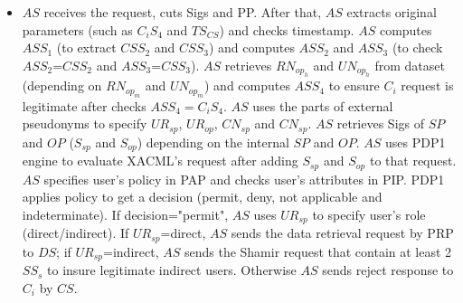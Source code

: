 \documentclass[journal,article,submit,moreauthors,pdftex]{Definitions/mdpi}
\makeatletter
\newcommand\notsotiny{\@setfontsize\notsotiny{6.31415}{7.1828}}
\makeatother
\begin{document}
\begin{itemize}
\begin{itemize}[topsep=0pt,itemsep=-1ex,partopsep=1ex,parsep=1ex]
\begin{itemize} [topsep=0pt,itemsep=-1ex,partopsep=1ex,parsep=1ex]
\begin{enumerate}
\begin{itemize}
\item $AS$ receives the request, cuts Sigs and PP. After that, $AS$ extracts original parameters (such as $C_iS_4$ and $TS_{CS}$) and checks timestamp. $AS$ computes $ASS_1$ (to extract $CSS_2$ and $CSS_3$) and computes $ASS_2$ and $ASS_3$ (to check $ASS_2$=$CSS_2$ and $ASS_3$=$CSS_3$). $AS$ retrieves $RN_{op_h}$ and $UN_{op_h}$ from dataset (depending on $RN_{op_m}$ and $UN_{op_m}$) and computes $ASS_4$ to ensure $C_i$ request is legitimate after checks $ASS_4=C_iS_4$. $AS$ uses the parts of external pseudonyms to specify $UR_{sp}$, $UR_{op}$, $CN_{sp}$ and $CN_{sp}$. $AS$ retrieves Sigs of $SP$ and $OP$ ($S_{sp}$ and $S_{op}$) depending on the internal $SP$ and $OP$. $AS$ uses PDP1 engine to evaluate XACML's request after adding $S_{sp}$ and $S_{op}$ to that request. $AS$ specifies user's policy in PAP and checks user's attributes in PIP. PDP1 applies policy to get a decision (permit, deny, not applicable and indeterminate). If decision="permit", $AS$ uses $UR_{sp}$ to specify user's role (direct/indirect). If $UR_{sp}$=direct, $AS$ sends the data retrieval request by PRP to $DS$; if $UR_{sp}$=indirect, $AS$ sends the Shamir request that contain at least 2 $SS_s$ to insure legitimate indirect users. Otherwise $AS$ sends reject response to $C_i$ by $CS$.
\end{itemize}
\begin{figure}[ht]
\centering
\scriptsize
{}
\end{figure}
\end{enumerate}
\end{itemize}
\end{itemize}
\end{itemize}
\end{document}
